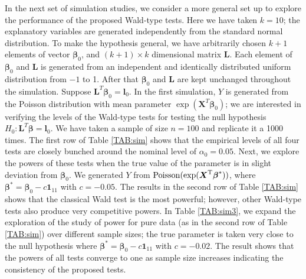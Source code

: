 \documentclass[a4paper]{article}%
\begin{document}
In the next set of simulation studies, we consider a more general set up to explore the performance of the proposed Wald-type tests. 
Here we have taken $k=10$;  the explanatory variables are generated independently from the standard normal distribution. 
To make the hypothesis general, we have arbitrarily chosen $k+1$ elements of vector $\boldsymbol{\beta}_0$,  
and $(k+1)\times k$ dimensional matrix $\boldsymbol{L}$. 
Each element of $\boldsymbol{\beta}_0$ and $\boldsymbol{L}$  is generated from an independent and identically distributed uniform distribution from $-1$ to 1. 
After that  $\boldsymbol{\beta}_0$ and $\boldsymbol{L}$ are kept unchanged throughout the simulation. 
Suppose $\boldsymbol{L}^{T} \boldsymbol{\beta}_0 = \boldsymbol{l}_0$. In the first simulation, 
$Y$ is generated from the Poisson distribution with mean parameter $\exp(\boldsymbol{X}^T \boldsymbol{\beta}_0)$;  
we are interested in verifying the levels of the Wald-type tests for testing the null hypothesis 
$H_0: \boldsymbol{L}^{T} \boldsymbol{\beta} = \boldsymbol{l}_0$. We have taken a sample of size $n=100$ and replicate it a 1000 times. 
The first row of Table \ref{TAB:sim} shows that the empirical levels of all four tests are closely bunched around the nominal level of $\alpha_0=0.05$. 
Next, we explore the powers of these tests when the true value of the parameter is in slight deviation from $\boldsymbol{\beta}_0$. 
We generated $Y$ from $\rm{Poisson}(exp(\boldsymbol{X}^T \boldsymbol{\beta}^*))$, 
where $\boldsymbol{\beta}^* = \boldsymbol{\beta}_0 - c \boldsymbol{1}_{11}$ with $c = - 0.05$. 
The results in the second row of Table \ref{TAB:sim} shows that the classical Wald test is the most powerful; 
however, other Wald-type tests  also produce very competitive powers. 
In Table \ref{TAB:sim3}, we expand the exploration of the study of power for pure data 
(as in the second row of Table \ref{TAB:sim}) over different sample sizes;  
the true parameter is taken very close to the null hypothesis where $\boldsymbol{\beta}^* = \boldsymbol{\beta}_0 - c \boldsymbol{1}_{11}$ with $c = - 0.02$. 
The result shows that the powers of all tests converge to one as sample size increases
indicating the consistency of the proposed tests. 
\end{document}
